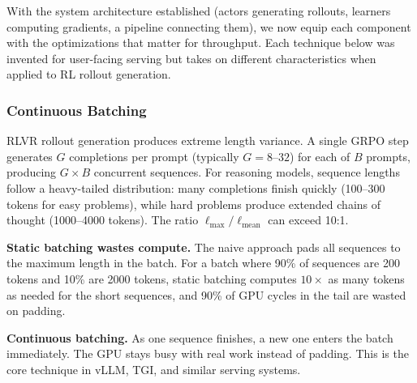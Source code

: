 With the system architecture established (actors generating rollouts, learners computing gradients, a pipeline connecting them), we now equip each component with the optimizations that matter for throughput. Each technique below was invented for user-facing serving but takes on different characteristics when applied to RL rollout generation.

\subsubsection*{Continuous Batching}

RLVR rollout generation produces extreme length variance. A single GRPO step generates $G$ completions per prompt (typically $G = 8$--$32$) for each of $B$ prompts, producing $G \times B$ concurrent sequences. For reasoning models, sequence lengths follow a heavy-tailed distribution: many completions finish quickly (100--300 tokens for easy problems), while hard problems produce extended chains of thought (1000--4000 tokens). The ratio $\ell_{\max} / \ell_{\text{mean}}$ can exceed 10:1.

\textbf{Static batching wastes compute.} The naive approach pads all sequences to the maximum length in the batch. For a batch where 90\% of sequences are 200 tokens and 10\% are 2000 tokens, static batching computes $10\times$ as many tokens as needed for the short sequences, and 90\% of GPU cycles in the tail are wasted on padding.

\textbf{Continuous batching.} As one sequence finishes, a new one enters the batch immediately. The GPU stays busy with real work instead of padding. This is the core technique in vLLM, TGI, and similar serving systems.


